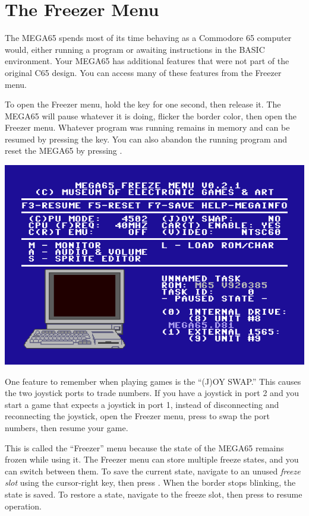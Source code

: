 \section{The Freezer Menu}
\label{sec:freezer}
\nopagebreak
The MEGA65 spends most of its time behaving as a Commodore 65 computer would, either running a program or awaiting instructions in the BASIC environment. Your MEGA65 has additional features that were not part of the original C65 design. You can access many of these features from the Freezer menu.

To open the Freezer menu, hold the  key for one second, then release it. The MEGA65 will pause whatever it is doing, flicker the border color, then open the Freezer menu. Whatever program was running remains in memory and can be resumed by pressing the  key. You can also abandon the running program and reset the MEGA65 by pressing .

\begin{center}
  \includegraphics[width=0.7\linewidth]{images/freezer.png}
\end{center}

One feature to remember when playing games is the ``(J)OY SWAP.'' This causes the two joystick ports to trade numbers. If you have a joystick in port 2 and you start a game that expects a joystick in port 1, instead of disconnecting and reconnecting the joystick, open the Freezer menu, press  to swap the port numbers, then resume your game.

This is called the ``Freezer'' menu because the state of the MEGA65 remains frozen while using it. The Freezer menu can store multiple freeze states, and you can switch between them. To save the current state, navigate to an unused {\it freeze slot} using the cursor-right key, then press . When the border stops blinking, the state is saved. To restore a state, navigate to the freeze slot, then press  to resume operation.

